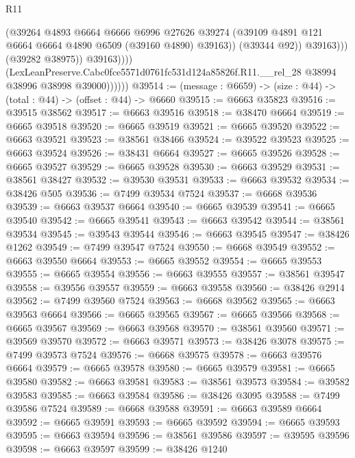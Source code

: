 \begin{lexlean}{R11}
\begin{coremodule}
                                (@39264
                                  @4893
                                  @6664
                                  @6666
                                  @6996
                                  @27626
                                  @39274
                                  (@39109 @4891 @121 @6664 @6664 @4890 @6509 (@39160 @4890) @39163))
                                (@39344 @92))
                              @39163)))
                        (@39282 @38975))
                      @39163))))
              (LexLeanPreserve.Cabc0fce5571d0761fc531d124a85826f.R11.__rel_28
                @38994
                @38996
                @38998
                @39000))))))
@39514 := (message : @6659) -> (size : @44) -> (total : @44) -> (offset : @44) -> @6660
@39515 := @6663 @35823
@39516 := @39515 @38562
@39517 := @6663 @39516
@39518 := @38470 @6664
@39519 := @6665 @39518
@39520 := @6665 @39519
@39521 := @6665 @39520
@39522 := @6663 @39521
@39523 := @38561 @38466
@39524 := @39522 @39523
@39525 := @6663 @39524
@39526 := @38431 @6664
@39527 := @6665 @39526
@39528 := @6665 @39527
@39529 := @6665 @39528
@39530 := @6663 @39529
@39531 := @38561 @38427
@39532 := @39530 @39531
@39533 := @6663 @39532
@39534 := @38426 @505
@39536 := @7499 @39534 @7524
@39537 := @6668 @39536
@39539 := @6663 @39537 @6664
@39540 := @6665 @39539
@39541 := @6665 @39540
@39542 := @6665 @39541
@39543 := @6663 @39542
@39544 := @38561 @39534
@39545 := @39543 @39544
@39546 := @6663 @39545
@39547 := @38426 @1262
@39549 := @7499 @39547 @7524
@39550 := @6668 @39549
@39552 := @6663 @39550 @6664
@39553 := @6665 @39552
@39554 := @6665 @39553
@39555 := @6665 @39554
@39556 := @6663 @39555
@39557 := @38561 @39547
@39558 := @39556 @39557
@39559 := @6663 @39558
@39560 := @38426 @2914
@39562 := @7499 @39560 @7524
@39563 := @6668 @39562
@39565 := @6663 @39563 @6664
@39566 := @6665 @39565
@39567 := @6665 @39566
@39568 := @6665 @39567
@39569 := @6663 @39568
@39570 := @38561 @39560
@39571 := @39569 @39570
@39572 := @6663 @39571
@39573 := @38426 @3078
@39575 := @7499 @39573 @7524
@39576 := @6668 @39575
@39578 := @6663 @39576 @6664
@39579 := @6665 @39578
@39580 := @6665 @39579
@39581 := @6665 @39580
@39582 := @6663 @39581
@39583 := @38561 @39573
@39584 := @39582 @39583
@39585 := @6663 @39584
@39586 := @38426 @3095
@39588 := @7499 @39586 @7524
@39589 := @6668 @39588
@39591 := @6663 @39589 @6664
@39592 := @6665 @39591
@39593 := @6665 @39592
@39594 := @6665 @39593
@39595 := @6663 @39594
@39596 := @38561 @39586
@39597 := @39595 @39596
@39598 := @6663 @39597
@39599 := @38426 @1240

\end{coremodule}
\end{lexlean}
